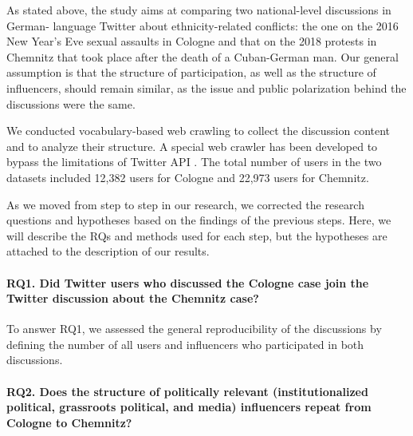As stated above, the study aims at comparing two national-level discussions in German- language Twitter about ethnicity-related conflicts: the one on the 2016 New Year’s Eve sexual assaults in Cologne and that on the 2018 protests in Chemnitz that took place after the death of a Cuban-German man. Our general assumption is that the structure of participation, as well as the structure of influencers, should remain similar, as the issue and public polarization behind the discussions were the same.

We conducted vocabulary-based web crawling to collect the discussion content and to analyze their structure. A special web crawler has been developed to bypass the limitations of Twitter API \cite{BlekanovSergeevMartynenko}. The total number of users in the two datasets included 12,382 users for Cologne and 22,973 users for Chemnitz.

As we moved from step to step in our research, we corrected the research questions and hypotheses based on the findings of the previous steps. Here, we will describe the RQs and methods used for each step, but the hypotheses are attached to the description of our results.

\paragraph{RQ1. Did Twitter users who discussed the Cologne case join the Twitter discussion about the Chemnitz case?}

To answer RQ1, we assessed the general reproducibility of the discussions by defining the number of all users and influencers who participated in both discussions.

\paragraph{RQ2. Does the structure of politically relevant (institutionalized political, grassroots political, and media) influencers repeat from Cologne to Chemnitz?}

